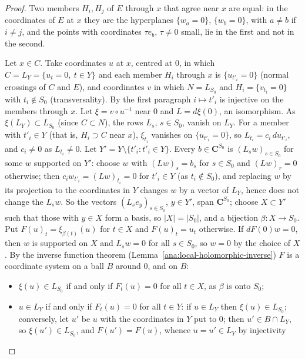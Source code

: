 \begin{proof}
\leanok
Two members \(H_i,H_j\) of \(E\) through \(x\) that agree near \(x\) are equal: in the coordinates of \(E\) at \(x\) they are the hyperplanes
\(\{w_a=0\}\), \(\{w_b=0\}\), with \(a\ne b\) if \(i\ne j\), and the points with coordinates \(\tau e_b\), \(\tau\ne0\) small, lie in the first and not in
the second.

Let \(x\in C\). Take coordinates \(u\) at \(x\), centred at \(0\), in which \(C=L_Y=\{u_t=0,\ t\in Y\}\) and each member \(H_i\) through \(x\) is
\(\{u_{t'_i}=0\}\) (normal crossings of \(C\) and \(E\)), and coordinates \(v\) in which \(N=L_{S_0}\) and \(H_i=\{v_{t_i}=0\}\) with
\(t_i\notin S_0\) (transversality). By the first paragraph \(i\mapsto t'_i\) is injective on the members through \(x\). Let \(\xi=v\circ u^{-1}\)
near \(0\) and \(L=d\xi(0)\), an isomorphism. As \(\xi(L_Y)\subset L_{S_0}\) (since \(C\subset N\)), the rows \(L_s\), \(s\in S_0\), vanish on
\(L_Y\). For a member with \(t'_i\in Y\) (that is, \(H_i\supset C\) near \(x\)), \(\xi_{t_i}\) vanishes on \(\{u_{t'_i}=0\}\), so
\(L_{t_i}=c_i\,du_{t'_i}\), and \(c_i\ne0\) as \(L_{t_i}\ne0\). Let \(Y'=Y\setminus\{t'_i:t'_i\in Y\}\). Every \(b\in\mathbf C^{S_0}\) is
\((L_sw)_{s\in S_0}\) for some \(w\) supported on \(Y'\): choose \(w\) with \((Lw)_s=b_s\) for \(s\in S_0\) and \((Lw)_r=0\) otherwise; then
\(c_iw_{t'_i}=(Lw)_{t_i}=0\) for \(t'_i\in Y\) (as \(t_i\notin S_0\)), and replacing \(w\) by its projection to the coordinates in \(Y\)
changes \(w\) by a vector of \(L_Y\), hence does not change the \(L_sw\). So the vectors \((L_se_y)_{s\in S_0}\), \(y\in Y'\), span
\(\mathbf C^{S_0}\); choose \(X\subset Y'\) such that those with \(y\in X\) form a basis, so \(|X|=|S_0|\), and a bijection
\(\beta:X\to S_0\). Put \(F(u)_t=\xi_{\beta(t)}(u)\) for \(t\in X\) and \(F(u)_t=u_t\) otherwise. If \(dF(0)w=0\), then \(w\) is supported on
\(X\) and \(L_sw=0\) for all \(s\in S_0\), so \(w=0\) by the choice of \(X\). By the inverse function theorem
(Lemma~\ref{ana:local-holomorphic-inverse}) \(F\) is a coordinate system on a ball \(B\) around \(0\), and on \(B\):
\begin{itemize}
\item \(\xi(u)\in L_{S_0}\) if and only if \(F_t(u)=0\) for all \(t\in X\), as \(\beta\) is onto \(S_0\);
\item \(u\in L_Y\) if and only if \(F_t(u)=0\) for all \(t\in Y\): if \(u\in L_Y\) then \(\xi(u)\in L_{S_0}\); conversely, let \(u'\) be \(u\) with
the coordinates in \(Y\) put to \(0\); then \(u'\in B\cap L_Y\), so \(\xi(u')\in L_{S_0}\), and \(F(u')=F(u)\), whence \(u=u'\in L_Y\) by injectivity

\end{itemize}
\end{proof}
